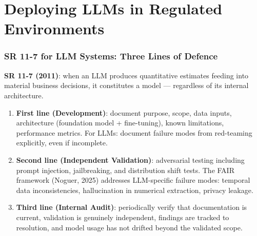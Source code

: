 \documentclass[9pt,t]{beamer}
\begin{document}
\section{Deploying LLMs in Regulated Environments}

\begin{frame}
\frametitle{SR 11-7 for LLM Systems: Three Lines of Defence}

\textbf{SR 11-7 (2011)}: when an LLM produces quantitative estimates feeding into material business decisions, it constitutes a model --- regardless of its internal architecture.

\medskip
\begin{enumerate}
  \item \textbf{First line (Development)}: document purpose, scope, data inputs, architecture (foundation model + fine-tuning), known limitations, performance metrics. For LLMs: document failure modes from red-teaming explicitly, even if incomplete.

  \item \textbf{Second line (Independent Validation)}: adversarial testing including prompt injection, jailbreaking, and distribution shift tests. The FAIR framework (Noguer, 2025) addresses LLM-specific failure modes: temporal data inconsistencies, hallucination in numerical extraction, privacy leakage.

  \item \textbf{Third line (Internal Audit)}: periodically verify that documentation is current, validation is genuinely independent, findings are tracked to resolution, and model usage has not drifted beyond the validated scope.
\end{enumerate}
\end{frame}
\end{document}
